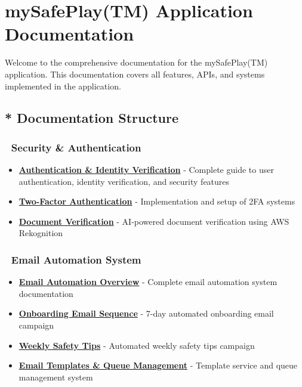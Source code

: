 \documentclass[11pt,a4paper]{article}
\begin{document}
\hypertarget{mysafeplaytm-application-documentation}{%
\section{mySafePlay(TM) Application
Documentation}\label{mysafeplaytm-application-documentation}}

Welcome to the comprehensive documentation for the mySafePlay(TM)
application. This documentation covers all features, APIs, and systems
implemented in the application.

\hypertarget{documentation-structure}{%
\subsection{* Documentation Structure}\label{documentation-structure}}

\hypertarget{security-authentication}{%
\subsubsection{🔐 Security \&
Authentication}\label{security-authentication}}

\begin{itemize}
\tightlist
\item
  \textbf{\href{./security/authentication.md}{Authentication \& Identity
  Verification}} - Complete guide to user authentication, identity
  verification, and security features
\item
  \textbf{\href{./security/two-factor-auth.md}{Two-Factor
  Authentication}} - Implementation and setup of 2FA systems
\item
  \textbf{\href{./security/document-verification.md}{Document
  Verification}} - AI-powered document verification using AWS
  Rekognition
\end{itemize}

\hypertarget{email-automation-system}{%
\subsubsection{📧 Email Automation
System}\label{email-automation-system}}

\begin{itemize}
\tightlist
\item
  \textbf{\href{./email/automation-overview.md}{Email Automation
  Overview}} - Complete email automation system documentation
\item
  \textbf{\href{./email/onboarding-sequence.md}{Onboarding Email
  Sequence}} - 7-day automated onboarding email campaign
\item
  \textbf{\href{./email/weekly-campaigns.md}{Weekly Safety Tips}} -
  Automated weekly safety tips campaign
\item
  \textbf{\href{./email/templates-and-queues.md}{Email Templates \&
  Queue Management}} - Template service and queue management system
\end{itemize}
\end{document}
